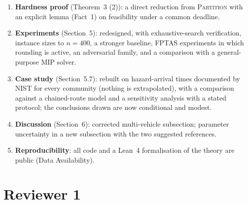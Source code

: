 \documentclass[11pt]{article}
\begin{document}
\begin{enumerate}[leftmargin=*,itemsep=2pt]
dispatch time (Proposition~19, Theorems~20--21), which shows that even a
front that starts at the depot gives an NP-hard problem. Finally, for a
front slower than the crew we give a polynomial-time approximation algorithm
for the chained route whose ratio depends only on the front's speed
(Theorem~22; it uses a point-to-point orienteering algorithm from the
literature as a subroutine, refines the scheme of Bansal et al.\ (STOC 2004)
for the ``small margin'' case of deadline-TSP, which as we read it is
bicriteria for these deadlines, by making the route strictly feasible, and says
nothing about general deadlines, for which only an $O(\log n)$ guarantee is
known), show that the round-trip
surrogate cannot give such a guarantee at any fixed speed (Proposition~23),
and observe that the unit-weight chained problem is strongly NP-hard even for
equidistant sites (Theorem~24; this is the hardness of rooted orienteering,
and we say so), so no FPTAS exists. These statements
are checked against brute force (\texttt{verify\_geometry.py}); they are
\emph{not} formalised in Lean, and the manuscript says so.
\item \textbf{Hardness proof} (Theorem~3 (2)): a direct reduction from
\textsc{Partition} with an explicit lemma (Fact~1) on feasibility under
a common deadline.
\item \textbf{Experiments} (Section~5): redesigned, with exhaustive-search
verification, instance sizes to $n=400$, a stronger baseline, FPTAS
experiments in which rounding is active, an adversarial family, and a
comparison with a general-purpose MIP solver.
\item \textbf{Case study} (Section~5.7): rebuilt on hazard-arrival times
documented by NIST for every community (nothing is extrapolated), with a
comparison against a chained-route model and a sensitivity analysis with
a stated protocol; the conclusions drawn are now conditional and modest.
\item \textbf{Discussion} (Section~6): corrected multi-vehicle
subsection; parameter uncertainty in a new subsection with the two
suggested references.
\item \textbf{Reproducibility}: all code and a Lean~4 formalisation of
the theory are public (Data Availability).
\end{enumerate}

\section{Reviewer 1}
\end{document}
